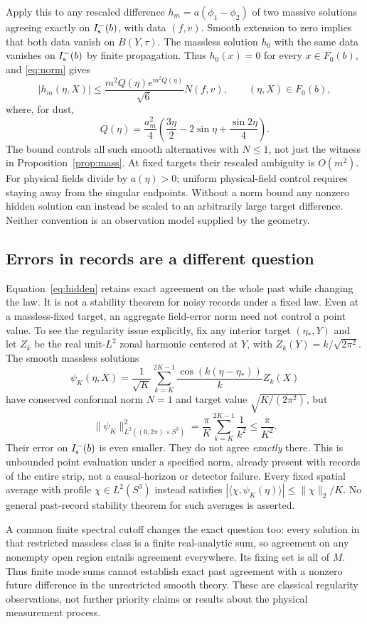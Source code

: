 Apply this to any rescaled difference $h_m=a(\phi_1-\phi_2)$ of two massive
solutions agreeing exactly on $I^-_{\mathrm s}(b)$, with data $(f,v)$. Smooth extension to zero
implies that both data vanish on $B(Y,\tau)$. The massless solution $h_0$
with the same data vanishes on $I^-_{\mathrm s}(b)$ by finite propagation. Thus
$h_0(x)=0$ for every $x\in F_0(b)$, and \eqref{eq:norm} gives
\begin{equation}\label{eq:hidden}
 |h_m(\eta,X)|\le
 \frac{m^2Q(\eta)e^{m^2Q(\eta)}}{\sqrt6}N(f,v),
 \qquad (\eta,X)\in F_0(b),
\end{equation}
where, for dust,
\[
 Q(\eta)=\frac{a_m^2}{4}
 \left(\frac{3\eta}{2}-2\sin\eta+\frac{\sin2\eta}{4}\right).
\]
The bound controls all such smooth alternatives with $N\le1$, not just the
witness in Proposition~\ref{prop:mass}. At fixed targets their rescaled
ambiguity is $O(m^2)$. For physical fields divide by $a(\eta)>0$; uniform
physical-field control requires staying away from the singular endpoints.
Without a norm bound any nonzero hidden solution can instead be scaled to
an arbitrarily large target difference. Neither convention is an observation
model supplied by the geometry.

\subsection{Errors in records are a different question}

Equation~\eqref{eq:hidden} retains exact agreement on the whole past while
changing the law. It is not a stability theorem for noisy records under a
fixed law. Even at a massless-fixed target, an aggregate field-error norm
need not control a point value. To see the regularity issue explicitly, fix
any interior target $(\eta_*,Y)$ and let $Z_k$ be the real unit-$L^2$ zonal
harmonic centered at $Y$, with $Z_k(Y)=k/\sqrt{2\pi^2}$. The smooth massless
solutions
\[
 \psi_K(\eta,X)=\frac1{\sqrt K}
  \sum_{k=K}^{2K-1}\frac{\cos(k(\eta-\eta_*))}{k}Z_k(X)
\]
have conserved conformal norm $N=1$ and target value
$\sqrt{K/(2\pi^2)}$, but
\[
 \|\psi_K\|_{L^2((0,2\pi)\times S^3)}^2
 =\frac\pi K\sum_{k=K}^{2K-1}\frac1{k^2}\le\frac\pi{K^2}.
\]
Their error on $I^-_{\mathrm s}(b)$ is even smaller. They do not agree \emph{exactly}
there. This is unbounded point evaluation under a specified norm, already
present with records of the entire strip, not a causal-horizon or detector
failure. Every fixed spatial average with profile $\chi\in L^2(S^3)$ instead
satisfies $|\langle\chi,\psi_K(\eta)\rangle|\le\|\chi\|_2/K$.
No general past-record stability theorem for such averages is asserted.

A common finite spectral cutoff changes the exact question too: every
solution in that restricted massless class is a finite real-analytic sum,
so agreement on any nonempty open region entails agreement everywhere.
Its fixing set is all of $M$. Thus finite mode sums cannot establish exact
past agreement with a nonzero future difference in the unrestricted smooth
theory. These are classical regularity observations, not further priority
claims or results about the physical measurement process.
